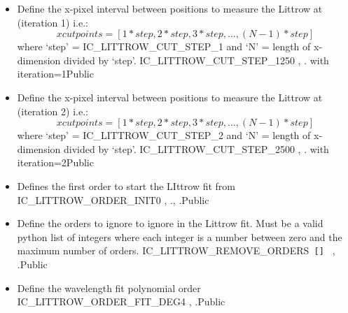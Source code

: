 \begin{itemize}
\item {} 
{Define the x-pixel interval between positions to measure the Littrow at (iteration 1)
i.e.:
\begin{equation}
xcutpoints = [1 * step, 2 * step, 3 * step, ..., (N-1) * step]
\end{equation}
where `step' = IC\_LITTROW\_CUT\_STEP\_1 and `N' = length of x-dimension divided by `step'.}
{IC\_LITTROW\_CUT\_STEP\_1}{250}
{\calHC, \calWAVE}{\constantsfile}{\spirouTHORCA. with iteration=1}{Public}

\item {} 
{Define the x-pixel interval between positions to measure the Littrow at (iteration 2)
i.e.:
\begin{equation}
xcutpoints = [1 * step, 2 * step, 3 * step, ..., (N-1) * step]
\end{equation}
where `step' = IC\_LITTROW\_CUT\_STEP\_2 and `N' = length of x-dimension divided by `step'.}
{IC\_LITTROW\_CUT\_STEP\_2}{500}
{\calHC, \calWAVE}{\constantsfile}{\spirouTHORCA. with iteration=2}{Public}

\item {} 
{Defines the first order to start the LIttrow fit from}
{IC\_LITTROW\_ORDER\_INIT}{0}
{\calHC, \calWAVE}{\constantsfile}{\spirouTHORCA., \spirouTHORCA.}{Public}

\item {} 
{Define the orders to ignore to ignore in the Littrow fit. Must be a valid python list of integers where each integer is a number between zero and the maximum number of orders.}
{IC\_LITTROW\_REMOVE\_ORDERS}{\lstinline[style=pythoninline]| [] |}
{\calHC, \calWAVE}{\constantsfile}{\spirouTHORCA.}{Public}

\item {} 
{Define the wavelength fit polynomial order}
{IC\_LITTROW\_ORDER\_FIT\_DEG}{4}
{\calHC, \calWAVE}{\constantsfile}{\spirouTHORCA.}{Public}


\end{itemize}
